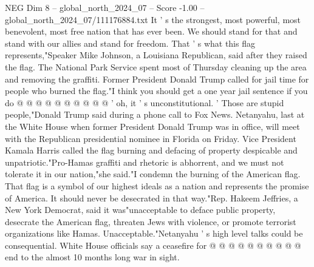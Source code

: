 \begin{textsample}{NEG Dim 8 – global\_north\_2024\_07 – Score -1.00 – global\_north\_2024\_07/111176884.txt}
It ' s the strongest, most powerful, most benevolent, most free nation that has ever been.
We should stand for that and stand with our allies and stand for freedom.
That ' s what this flag represents,"Speaker Mike Johnson, a Louisiana Republican, said after they raised the flag.
The National Park Service spent most of Thursday cleaning up the area and removing the graffiti.
Former President Donald Trump called for jail time for people who burned the flag."I think you should get a one year jail sentence if you do @ @ @ @ @ @ @ @ @ @ ' oh, it ' s unconstitutional. ' Those are stupid people,"Donald Trump said during a phone call to Fox News.
Netanyahu, last at the White House when former President Donald Trump was in office, will meet with the Republican presidential nominee in Florida on Friday.
Vice President Kamala Harris called the flag burning and defacing of property despicable and unpatriotic."Pro-Hamas graffiti and rhetoric is abhorrent, and we must not tolerate it in our nation,"she said."I condemn the burning of the American flag.
That flag is a symbol of our highest ideals as a nation and represents the promise of America.
It should never be desecrated in that way."Rep.
Hakeem Jeffries, a New York Democrat, said it was"unacceptable to deface public property, desecrate the American flag, threaten Jews with violence, or promote terrorist organizations like Hamas.
Unacceptable."Netanyahu ' s high level talks could be consequential.
White House officials say a ceasefire for @ @ @ @ @ @ @ @ @ @ end to the almost 10 months long war in sight.

\end{textsample}
